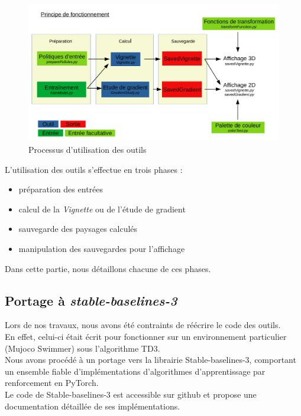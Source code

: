 \documentclass[12pt]{article}
\begin{document}
\begin{figure}[htp]
    \centering
    \includegraphics[width=18cm]{Images/Principe}
    \caption{Processus d'utilisation des outils}
    \label{fig:principe}
\end{figure}

L'utilisation des outils s'effectue en trois phases : 
\begin{itemize}
	\item préparation des entrées
	\item calcul de la \emph{Vignette} ou de l'étude de gradient
	\item sauvegarde des paysages calculés
	\item manipulation des sauvegardes pour l'affichage
\end{itemize}

Dans cette partie, nous détaillons chacune de ces phases.

\subsection{Portage à \emph{stable-baselines-3}}

Lors de nos travaux, nous avons été contraints de réécrire le code des outils. \\

En effet, celui-ci était écrit pour fonctionner sur un environnement particulier (Mujoco Swimmer) sous l’algorithme TD3. \\

Nous avons procédé à un portage vers la librairie Stable-baselines-3, comportant un ensemble fiable d’implémentations d’algorithmes d’apprentissage par renforcement en PyTorch. \\

Le code de Stable-baselines-3 est accessible sur github et propose une documentation détaillée de ses implémentations. \\
\end{document}
